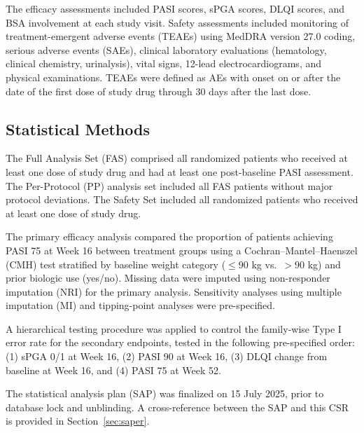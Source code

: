 \documentclass[11pt, a4paper]{article}
\begin{document}
The efficacy assessments included PASI scores, sPGA scores, DLQI scores, and BSA involvement at each study visit. Safety assessments included monitoring of treatment-emergent adverse events (TEAEs) using MedDRA version 27.0 coding, serious adverse events (SAEs), clinical laboratory evaluations (hematology, clinical chemistry, urinalysis), vital signs, 12-lead electrocardiograms, and physical examinations. TEAEs were defined as AEs with onset on or after the date of the first dose of study drug through 30 days after the last dose.

\subsection{Statistical Methods}

The Full Analysis Set (FAS) comprised all randomized patients who received at least one dose of study drug and had at least one post-baseline PASI assessment. The Per-Protocol (PP) analysis set included all FAS patients without major protocol deviations. The Safety Set included all randomized patients who received at least one dose of study drug.

\vspace{4pt}
The primary efficacy analysis compared the proportion of patients achieving PASI 75 at Week 16 between treatment groups using a Cochran--Mantel--Haenszel (CMH) test stratified by baseline weight category ($\le 90$ kg vs.\ $> 90$ kg) and prior biologic use (yes/no). Missing data were imputed using non-responder imputation (NRI) for the primary analysis. Sensitivity analyses using multiple imputation (MI) and tipping-point analyses were pre-specified.

\vspace{4pt}
A hierarchical testing procedure was applied to control the family-wise Type I error rate for the secondary endpoints, tested in the following pre-specified order: (1) sPGA 0/1 at Week 16, (2) PASI 90 at Week 16, (3) DLQI change from baseline at Week 16, and (4) PASI 75 at Week 52.

\begin{notebox}
The statistical analysis plan (SAP) was finalized on 15 July 2025, prior to database lock and unblinding. A cross-reference between the SAP and this CSR is provided in Section~\ref{sec:saper}.
\end{notebox}

\newpage

\end{document}
